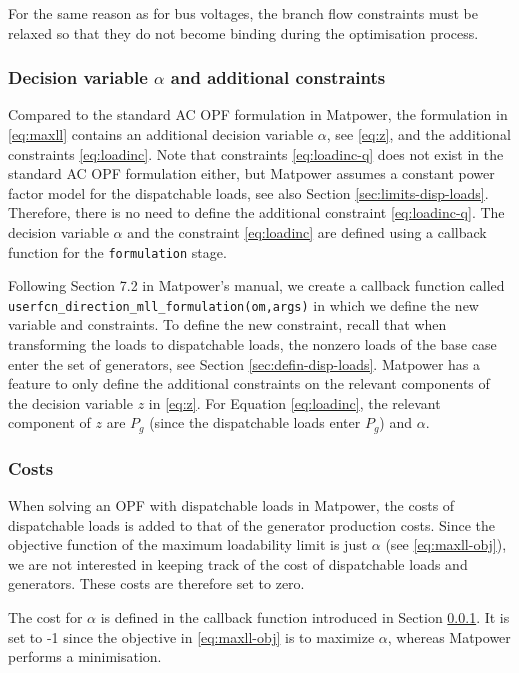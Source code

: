 \documentclass[12pt,a4]{article}
\newcommand*{\codemat}[1]{\texttt{#1}}
\newcommand*{\matpower}{{\sc Matpower}}
\begin{document}
For the same reason as for bus voltages, the branch flow constraints must be relaxed so that they do not become binding during the optimisation process.

\subsubsection{Decision variable $\alpha$ and additional constraints}
\label{sec:defin-vari-alpha}

Compared to the standard AC OPF formulation in \matpower{}, the formulation in \eqref{eq:maxll} contains an additional decision variable $\alpha$, see \eqref{eq:z}, and the additional constraints \eqref{eq:loadinc}.
Note that constraints \eqref{eq:loadinc-q} does not exist in the standard AC OPF formulation either, but \matpower{} assumes a constant power factor model for the dispatchable loads, see also Section \ref{sec:limits-disp-loads}.
Therefore, there is no need to define the additional constraint \eqref{eq:loadinc-q}.
The decision variable $\alpha$ and the constraint \eqref{eq:loadinc} are defined using a callback function for the \codemat{formulation} stage.

Following Section 7.2 in \matpower{}'s manual, we create a callback function called \codemat{userfcn\_direction\_mll\_formulation(om,args)} in which we define the new variable and constraints.
To define the new constraint, recall that when transforming the loads to dispatchable loads, the nonzero loads of the base case enter the set of generators, see Section \ref{sec:defin-disp-loads}.
\matpower{} has a feature to only define the additional constraints on the relevant components of the decision variable $z$ in \eqref{eq:z}.
For Equation \eqref{eq:loadinc}, the relevant component of $z$ are $P_g$ (since the dispatchable loads enter $P_g$) and $\alpha$.

\subsubsection{Costs}
\label{sec:costs}

When solving an OPF with dispatchable loads in \matpower{}, the costs of dispatchable loads is added to that of the generator production costs.
Since the objective function of the maximum loadability limit is just $\alpha$ (see \eqref{eq:maxll-obj}), we are not interested in keeping track of the cost of dispatchable loads and generators.
These costs are therefore set to zero.

The cost for $\alpha$ is defined in the callback function introduced in Section \ref{sec:defin-vari-alpha}.
It is set to -1 since the objective in \eqref{eq:maxll-obj} is to maximize $\alpha$, whereas \matpower{} performs a minimisation.
\end{document}
